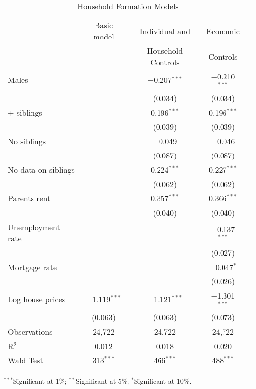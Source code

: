 \documentclass[12pt]{article}
\begin{document}
\begin{table}[htpb] \centering
  \begin{threeparttable}
  \caption{Household Formation Models}
  \label{mainRes}
  \tabularnewline
\begin{tabular}{@{\extracolsep{1pt}}lcccc}
\toprule
& Basic model & Individual and  & Economic \\
&  & Household Controls & Controls \\
\midrule
Males &  & $-$0.207$^{***}$ & $-$0.210$^{***}$ \\
 &  & (0.034) & (0.034) \\
\addlinespace[0.5em]
2+ siblings &  & 0.196$^{***}$ & 0.196$^{***}$ \\
 &  & (0.039) & (0.039) \\
\addlinespace[0.5em]
No siblings &  & $-$0.049 & $-$0.046 \\
 &  & (0.087) & (0.087) \\
\addlinespace[0.5em]
No data on siblings &  & 0.224$^{***}$ & 0.227$^{***}$ \\
 &  & (0.062) & (0.062) \\
\addlinespace[0.5em]
Parents rent &  & 0.357$^{***}$ & 0.366$^{***}$ \\
 &  & (0.040) & (0.040) \\
\addlinespace[0.5em]
Unemployment rate &  &  & $-$0.137$^{***}$ \\
 &  &  & (0.027) \\
\addlinespace[0.5em]
Mortgage rate &  &  & $-$0.047$^{*}$ \\
 &  &  & (0.026) \\
\addlinespace[0.5em]
Log house prices & $-$1.119$^{***}$ & $-$1.121$^{***}$ & $-$1.301$^{***}$ \\
 & (0.063) & (0.063) & (0.073) \\
\addlinespace[0.5em]
Observations & 24,722 & 24,722 & 24,722 \\
R$^{2}$ & 0.012 & 0.018 & 0.020 \\
Wald Test & 313$^{***}$ & 466$^{***}$ & 488$^{***}$ \\
\bottomrule
\end{tabular}
\begin{tablenotes}[flushleft]
    \item $^{***}$Significant at 1\%; $^{**}$Significant at 5\%; $^{*}$Significant at 10\%.
\end{tablenotes}
\end{threeparttable}
\end{table}
\end{document}

